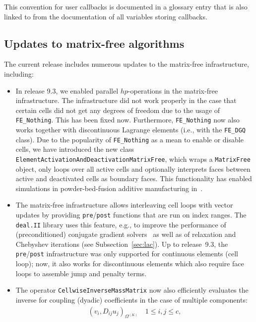 \documentclass{ansarticle-preprint}
\newcommand{\specialword}[1]{\texttt{#1}}
\newcommand{\dealii}{{\specialword{deal.II}}\xspace}
\begin{document}
This convention for user callbacks is documented in a glossary entry
that is also linked to from the documentation of all variables storing
callbacks.


\subsection{Updates to matrix-free algorithms}\label{sec:mf}

The current release includes numerous updates to the matrix-free
infrastructure, including:
\begin{itemize}
\item In release 9.3, we enabled parallel $hp$-operations in the matrix-free infrastructure.
The infrastructure did not work properly in the case that certain cells
did not get any degrees of freedom due to the usage of \texttt{FE\_Nothing}. This has been
fixed now. Furthermore, \texttt{FE\_Nothing} now also works together
with discontinuous Lagrange elements (i.e., with the \texttt{FE\_DGQ} class). Due to the popularity of \texttt{FE\_Nothing} as a mean to enable
or disable cells, we have introduced the new class
\texttt{ElementActivationAndDeactivationMatrixFree}, which wraps a \texttt{MatrixFree} object, only loops over all
active cells and optionally interprets faces between active and deactivated cells
as boundary faces. This functionality has enabled simulations in powder-bed-fusion additive
manufacturing in~\cite{proell2023highly}.
\item The matrix-free infrastructure allows interleaving cell loops with vector updates
  by providing \texttt{pre}/\texttt{post} functions that are run on index ranges.  The \dealii
  library uses this feature, e.g., to improve the performance of (preconditioned)
conjugate gradient solvers~\cite{kronbichler2022cg} as well as of relaxation and Chebyshev iterations (see Subsection~\ref{sec:lac}).
Up to release~9.3, the \texttt{pre}/\texttt{post} infrastructure was only supported for
continuous elements (cell loop); now, it also works for discontinuous
elements which also require face loops to assemble jump and penalty terms.
\item The operator \texttt{CellwiseInverseMassMatrix} now also efficiently
evaluates the inverse for coupling (dyadic) coefficients in the case of multiple
components:
\begin{align*}
\left(v_i, D_{ij} u_j  \right)_{\Omega^{(K)}}
\quad  1\le i,j \le c,
\end{align*}

\end{itemize}
\end{document}
